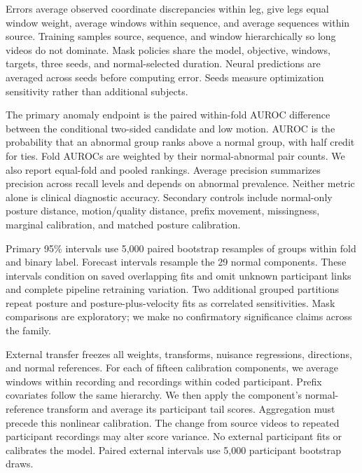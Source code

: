 \documentclass[letterpaper]{article}
\begin{document}
Errors average observed coordinate discrepancies within leg, give legs equal window weight, average windows within sequence, and average sequences within source. Training samples source, sequence, and window hierarchically so long videos do not dominate. Mask policies share the model, objective, windows, targets, three seeds, and normal-selected duration. Neural predictions are averaged across seeds before computing error. Seeds measure optimization sensitivity rather than additional subjects.

The primary anomaly endpoint is the paired within-fold AUROC difference between the conditional two-sided candidate and low motion. AUROC is the probability that an abnormal group ranks above a normal group, with half credit for ties. Fold AUROCs are weighted by their normal-abnormal pair counts. We also report equal-fold and pooled rankings. Average precision summarizes precision across recall levels and depends on abnormal prevalence. Neither metric alone is clinical diagnostic accuracy. Secondary controls include normal-only posture distance, motion/quality distance, prefix movement, missingness, marginal calibration, and matched posture calibration.

Primary 95\% intervals use 5,000 paired bootstrap resamples of groups within fold and binary label. Forecast intervals resample the 29 normal components. These intervals condition on saved overlapping fits and omit unknown participant links and complete pipeline retraining variation. Two additional grouped partitions repeat posture and posture-plus-velocity fits as correlated sensitivities. Mask comparisons are exploratory; we make no confirmatory significance claims across the family.

External transfer freezes all weights, transforms, nuisance regressions, directions, and normal references. For each of fifteen calibration components, we average windows within recording and recordings within coded participant. Prefix covariates follow the same hierarchy. We then apply the component's normal-reference transform and average its participant tail scores. Aggregation must precede this nonlinear calibration. The change from source videos to repeated participant recordings may alter score variance. No external participant fits or calibrates the model. Paired external intervals use 5,000 participant bootstrap draws.
\end{document}
